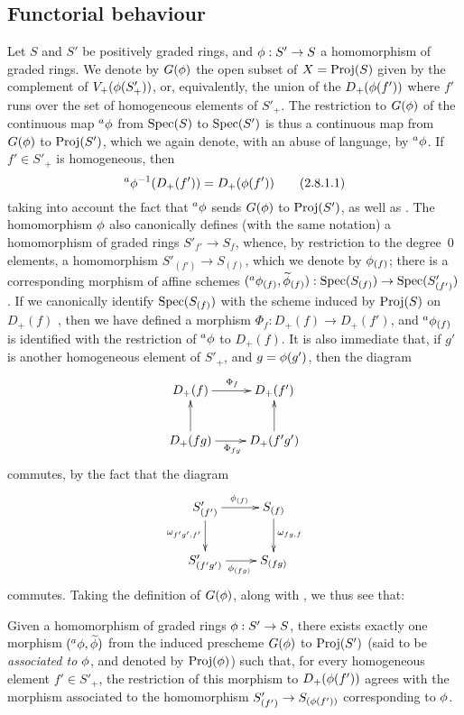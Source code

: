 \subsection{Functorial behaviour}
\label{subsection:II.2.8}

\begin{env}[2.8.1]
\label{II.2.8.1}
Let $S$ and $S'$ be positively graded rings, and $\vphi:S'\to S$ a homomorphism of graded rings.
We denote by $G(\phi)$ the open subset of $X=\operatorname{Proj}(S)$ given by the complement of $V_+(\phi(S'_+))$, or, equivalently, the union of the $D_+(\phi(f'))$ where $f'$ runs over the set of homogeneous elements of $S'_+$.
The restriction to $G(\phi)$ of the continuous map ${}^a\phi$ from $\operatorname{Spec}(S)$ to $\operatorname{Spec}(S')$  is thus a continuous map from $G(\phi)$ to $\operatorname{Proj}(S')$, which we again denote, with an abuse of language, by ${}^a\phi$.
If $f'\in S'_+$ is homogeneous, then
\[
\label{II.2.8.1.1}
  {}^a\phi^{-1}(D_+(f')) = D_+(\phi(f'))
\tag{2.8.1.1}
\]
taking into account the fact that ${}^a\phi$ sends $G(\phi)$ to $\operatorname{Proj}(S')$, as well as .
The homomorphism $\phi$ also canonically defines (with the same notation) a homomorphism of graded rings $S'_{f'}\to S_f$, whence, by restriction to the degree~$0$ elements,
a homomorphism $S'_{(f')}\to S_{(f)}$, which we denote by $\phi_{(f)}$;
there is a corresponding  morphism of affine schemes $({}^a\vphi_{(f)},\widetilde{\vphi}_{(f)}):\Spec(S_{(f)})\to\Spec(S'_{(f')})$.
If we canonically identify $\operatorname{Spec}(S_{(f)})$ with the scheme induced by $\operatorname{Proj}(S)$ on $D_+(f)$ , then we have defined a morphism $\Phi_f:D_+(f)\to D_+(f')$, and ${}^a\phi_{(f)}$ is identified with the restriction of ${}^a\phi$ to $D_+(f)$.
It is also immediate that, if $g'$ is another homogeneous element of $S'_+$, and $g=\phi(g')$, then the diagram
\[
  \xymatrix{
    D_+(f) \ar[r]^{\Phi_f}
    & D_+(f')
  \\D_+(fg) \ar[u] \ar[r]_{\Phi_{fg}}
    & D_+(f'g') \ar[u]
  }
\]
commutes, by the fact that the diagram
\[
  \xymatrix{
    S'_{(f')} \ar[r]^{\vphi_{(f)}} \ar[d]_{\omega_{f'g',f'}}
    & S_{(f)} \ar[d]^{\omega_{fg,f}}
  \\S'_{(f'g')} \ar[r]_{\vphi_{(fg)}}
    & S_{(fg)}
  }
\]
commutes.
Taking the definition of $G(\phi)$, along with , we thus see that:
\end{env}

\begin{proposition}[2.8.2]
\label{II.2.8.2}
Given a homomorphism of graded rings $\vphi: S'\to S$, there exists exactly one morphism $({}^a\phi,\widetilde{\phi})$ from the induced prescheme $G(\phi)$ to $\operatorname{Proj}(S')$ (said to be \emph{associated to $\phi$}, and denoted by $\operatorname{Proj}(\phi)$) such that, for every homogeneous element $f'\in S'_+$, the restriction of this morphism to $D_+(\phi(f'))$ agrees with the morphism associated to the homomorphism $S'_{(f')}\to S_{(\vphi(f'))}$ corresponding to $\phi$.
\end{proposition}

